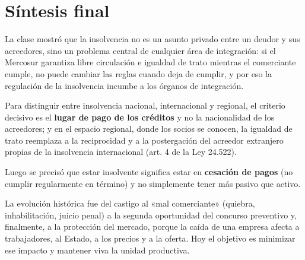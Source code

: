 \documentclass[12pt,oneside]{book}
\begin{document}
\chapter[Síntesis final]{Síntesis final}

La clase mostró que la insolvencia no es un asunto privado entre un deudor y sus acreedores, sino un problema central de cualquier área de integración: si el Mercosur garantiza libre circulación e igualdad de trato mientras el comerciante cumple, no puede cambiar las reglas cuando deja de cumplir, y por eso la regulación de la insolvencia incumbe a los órganos de integración.

Para distinguir entre insolvencia nacional, internacional y regional, el criterio decisivo es el \textbf{lugar de pago de los créditos} y no la nacionalidad de los acreedores; y en el espacio regional, donde los socios se conocen, la igualdad de trato reemplaza a la reciprocidad y a la postergación del acreedor extranjero propias de la insolvencia internacional (art. 4 de la Ley 24.522).

Luego se precisó que estar insolvente significa estar en \textbf{cesación de pagos} (no cumplir regularmente en término) y no simplemente tener más pasivo que activo.

La evolución histórica fue del castigo al «mal comerciante» (quiebra, inhabilitación, juicio penal) a la segunda oportunidad del concurso preventivo y, finalmente, a la protección del mercado, porque la caída de una empresa afecta a trabajadores, al Estado, a los precios y a la oferta. Hoy el objetivo es minimizar ese impacto y mantener viva la unidad productiva.
\end{document}
